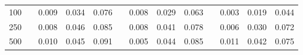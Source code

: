 % 
\begin{tabular}{ccccccccccccc}
  \hline
  \hline
100 &  & 0.009 & 0.034 & 0.076 &  & 0.008 & 0.029 & 0.063 &  & 0.003 & 0.019 & 0.044 \\ 
  250 &  & 0.008 & 0.046 & 0.085 &  & 0.008 & 0.041 & 0.078 &  & 0.006 & 0.030 & 0.072 \\ 
  500 &  & 0.010 & 0.045 & 0.091 &  & 0.005 & 0.044 & 0.085 &  & 0.011 & 0.042 & 0.075 \\ 
   \hline
\end{tabular}
